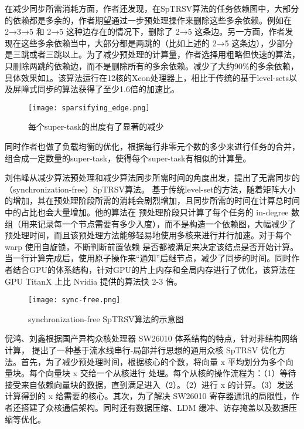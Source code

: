 在减少同步所需消耗方面，作者还发现，在SpTRSV算法的任务依赖图中，大部分的依赖都是多余的，作者期望通过一步预处理操作来删除这些多余依赖。例如在 2→3→5 和 2→5 这种边存在的情况下，删除了 2→5 这条边。另一方面，作者发现在这些多余依赖当中，大部分都是两跳的（比如上述的 2→5 这条边），少部分是三跳或者三跳以上。为了减少预处理的计算量，作者选择用粗略但快速的算法，只删除两跳的依赖边，而不是删除所有的多余依赖。减少了大约90\%的多余依赖，具体效果如\ref{sparsifying_edge}。该算法运行在12核的Xeon处理器上，相比于传统的基于level-sets以及屏障式同步的算法获得了至少1.6倍的加速比。

\begin{figure}[htbp]
    \centering
    \texttt{[image: sparsifying\_edge.png]}
    \caption{每个super-task的出度有了显著的减少}
    \label{sparsifying_edge}
\end{figure}

同时作者也做了负载均衡的优化，根据每行非零元个数的多少来进行任务的合并，组合成一定数量的super-task，使得每个super-task有相似的计算量。

刘伟峰\cite{liuSyncFree2016,liuFastSynchronizationfreeAlgorithms2017}从减少算法预处理和减少算法同步所需时间的角度出发，提出了无需同步的（synchronization-free）SpTRSV算法。 基于传统level-set的方法，随着矩阵大小的增加，其在预处理阶段所需的消耗会剧烈增加，且同步所需的时间在计算总时间中的占比也会大量增加。他的算法在 预处理阶段只计算了每个任务的 in-degree 数组（用来记录每一个节点需要有多少入度），而不是构造一个依赖图，大幅减少了预处理时间，而且该预处理方法能够轻易地使用多核来进行并行加速。对于每个 warp 使用自旋锁，不断判断前置依赖 是否都被满足来决定该结点是否开始计算。当一行计算完成后，使用原子操作来“通知”后继节点，减少了同步的时间。同时作者结合GPU的体系结构，针对GPU的片上内存和全局内存进行了优化，该算法在 GPU TitanX 上比 Nvidia 提供的算法快 2-3 倍。

\begin{figure}[htbp]
    \centering
    \texttt{[image: sync-free.png]}
    \caption{synchronization-free SpTRSV算法的示意图}
    \label{sync-free}
\end{figure}

倪鸿、刘鑫\cite{nihong2019}根据国产异构众核处理器 SW26010 体系结构的特点，针对非结构网络计算， 提出了一种基于流水线串行-局部并行思想的通用众核 SpTRSV 优化方法。首先，为了减少预处理时间，根据核心的个数，将向量 x 平均划分为多个向量块。每个向量块 x 交给一个从核进行 处理。每个从核的操作流程为：（1）等待接受来自依赖向量块的数据，直到满足进入（2）。（2）进行 x 的计算。（3）发送计算得到的 x 给需要的核心。其次，为了解决 SW26010 寄存器通讯的局限性，作者还搭建了众核通信架构。同时还有数据压缩、LDM 缓冲、访存掩盖以及数据压缩等优化。

